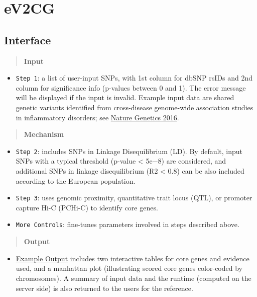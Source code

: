 \documentclass[
  oneside]{book}
\providecommand{\tightlist}{%
  \setlength{\itemsep}{0pt}\setlength{\parskip}{0pt}}
\begin{document}
\hypertarget{ev2cg}{%
\chapter{eV2CG}\label{ev2cg}}

\hypertarget{interface}{%
\section{Interface}\label{interface}}

\begin{quote}
\textbf{Input}
\end{quote}

\begin{itemize}
\tightlist
\item
  \texttt{Step\ 1}: a list of user-input SNPs, with 1st column for dbSNP rsIDs and 2nd column for significance info (p-values between 0 and 1). The error message will be displayed if the input is invalid. Example input data are shared genetic variants identified from cross-disease genome-wide association studies in inflammatory disorders; see \href{https://www.ncbi.nlm.nih.gov/pubmed/26974007}{Nature Genetics 2016}.
\end{itemize}

\begin{quote}
\textbf{Mechanism}
\end{quote}

\begin{itemize}
\item
  \texttt{Step\ 2}: includes SNPs in Linkage Disequilibrium (LD). By default, input SNPs with a typical threshold (p-value \textless{} 5e−8) are considered, and additional SNPs in linkage disequilibrium (R2 \textless{} 0.8) can be also included according to the European population.
\item
  \texttt{Step\ 3}: uses genomic proximity, quantitative trait locus (QTL), or promoter capture Hi-C (PCHi-C) to identify core genes.
\item
  \texttt{More\ Controls}: fine-tunes parameters involved in steps described above.
\end{itemize}

\begin{quote}
\textbf{Output}
\end{quote}

\begin{itemize}
\tightlist
\item
  \href{/app/examples/_tmp_RMD_eV2CG.html}{Example Output} includes two interactive tables for core genes and evidence used, and a manhattan plot (illustrating scored core genes color-coded by chromosomes). A summary of input data and the runtime (computed on the server side) is also returned to the users for the reference.
\end{itemize}
\end{document}
